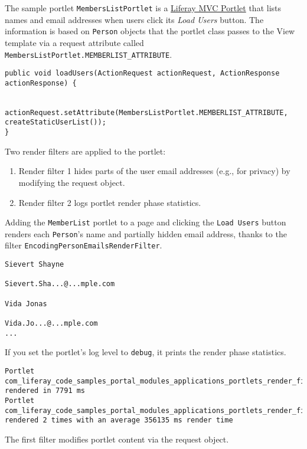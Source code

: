 The sample portlet \texttt{MembersListPortlet} is a
\href{/docs/7-2/appdev/-/knowledge_base/a/liferay-mvc-portlet}{Liferay
MVC Portlet} that lists names and email addresses when users click its
\emph{Load Users} button. The information is based on \texttt{Person}
objects that the portlet class passes to the View template via a request
attribute called \texttt{MembersListPortlet.MEMBERLIST\_ATTRIBUTE}.

\begin{verbatim}
public void loadUsers(ActionRequest actionRequest, ActionResponse actionResponse) {

    actionRequest.setAttribute(MembersListPortlet.MEMBERLIST_ATTRIBUTE, createStaticUserList());
}
\end{verbatim}

Two render filters are applied to the portlet:

\begin{enumerate}
\def\labelenumi{\arabic{enumi}.}
\item
  Render filter 1 hides parts of the user email addresses (e.g., for
  privacy) by modifying the request object.
\item
  Render filter 2 logs portlet render phase statistics.
\end{enumerate}

Adding the \texttt{MemberList} portlet to a page and clicking the
\texttt{Load\ Users} button renders each \texttt{Person}'s name and
partially hidden email address, thanks to the filter
\texttt{EncodingPersonEmailsRenderFilter}.

\begin{verbatim}
Sievert Shayne

Sievert.Sha...@...mple.com

Vida Jonas

Vida.Jo...@...mple.com
...
\end{verbatim}

If you set the portlet's log level to \texttt{debug}, it prints the
render phase statistics.

\begin{verbatim}
Portlet com_liferay_code_samples_portal_modules_applications_portlets_render_filter_MembersListPortlet rendered in 7791 ms
Portlet com_liferay_code_samples_portal_modules_applications_portlets_render_filter_MembersListPortlet rendered 2 times with an average 356135 ms render time
\end{verbatim}

The first filter modifies portlet content via the request object.

